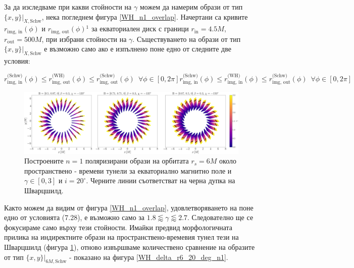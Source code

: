 За да изследваме при какви стойности на $\gamma$ можем да намерим образи от тип $\{x,y\}\vert_{X, \text{Schw}}$, нека погледнем фигура \ref{WH_n1_overlap}. Начертани са кривите $r_\text{img, in}(\phi)$ и $r_\text{img, out}(\phi)$$^1$ за екваториален диск с граници $r_\text{in} = 4.5M$, $r_\text{out} = 500M$, при избрани стойности на $\gamma$. Съществуването на образи от тип $\{x,y\}\vert_{X, \text{Schw}}$ е възможно само ако е изпълнено поне едно от следните две условия:


\begin{subequations}
	\begin{equation}
		r_\text{img, in}^{\text{(Schw)}}(\phi) \le r_\text{img, out}^{\text{(WH)}}(\phi) \le r_\text{img, out}^{\text{(Schw)}}(\phi)\,\,\, \forall\phi\in[0,2\pi]
	\end{equation}
	\begin{equation}
		r_\text{img, in}^{\text{(Schw)}}(\phi) \le r_\text{img, in}^{\text{(WH)}}(\phi) \le r_\text{img, out}^{\text{(Schw)}}(\phi)\,\,\, \forall\phi\in[0,2\pi]
	\end{equation}
\end{subequations}
\newpage
\begin{figure}[!htb]
	\hspace{-0.2cm}
	\includegraphics[scale = 0.17]{WH_alpha_Eq_Field_n1.png}
	\caption[Поляризирани $n=1$ образи около пространствено - времеви тунели за екваториално магнитно поле.]{\small Построените $n=1$ поляризирани образи на орбитата $r_s = 6M$ около пространствено - времеви тунели за екваториално магнитно поле и $\gamma \in[0,3]$ и $i = 20^\circ$. Черните линии съответстват на черна дупка на Шварцшилд.} 
	\label{WH_pol_eq_field_n1}
\end{figure}

\lfoot{}
Както можем да видим от фигура \ref{WH_n1_overlap}, удовлетворяването на поне едно от условията (7.28), е възможно само за  $1.8 \lessapprox \gamma \lessapprox 2.7$. Следователно ще се фокусираме само върху тези стойности. Имайки предвид морфологичната прилика на индиректните образи на пространствено-времевия тунел тези на Шварцшилд (фигура \ref{WH_pol_eq_field_n1}), отново извършваме количествено сравнение на образите от тип $\{x,y\}\vert_{6M, \text{Schw}}$ - показано на фигура \ref{WH_delta_r6_20_deg_n1}.\\

